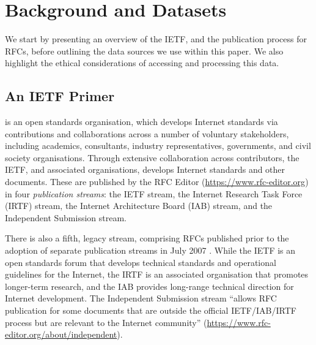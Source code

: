 \documentclass[twocolumn,10pt]{article}
\newcommand{\pb}[1]{\vspace{0.75ex}\noindent{\textbf{#1}}}
\begin{document}
\section{Background and Datasets}
\label{sec:background}


We start by presenting an overview of the IETF, and the publication process
for RFCs, before outlining the data sources we use within this paper. We
also highlight the ethical considerations of accessing and processing this
data.


\subsection{An IETF Primer}
\label{sec:background:ietf}


\pb{The IETF} is an open standards organisation, which develops
Internet standards via contributions and collaborations across a number of
voluntary stakeholders, including academics, consultants, industry
representatives, governments, and civil society organisations.  Through
extensive collaboration across contributors, the IETF, and associated
organisations, develops Internet standards and other documents. These are
published by the RFC Editor (\url{https://www.rfc-editor.org}) in four
\emph{publication streams}: the IETF stream, the Internet Research Task
Force (IRTF) stream, the Internet Architecture Board (IAB) stream, and the
Independent Submission stream.

There is also a fifth, legacy stream, comprising RFCs published prior to
the adoption of separate publication streams in July 2007 \cite{RFC4844}.
While the IETF is an open standards forum that develops technical standards
and operational guidelines for the Internet, the IRTF is an associated
organisation that promotes longer-term research, and the IAB provides
long-range technical direction for Internet development. The Independent
Submission stream ``allows RFC publication for some documents that are
outside the official IETF/IAB/IRTF process but are relevant to the Internet
community'' (\url{https://www.rfc-editor.org/about/independent}).
\end{document}
